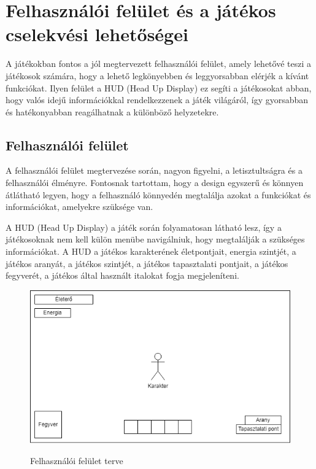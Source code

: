 \section{Felhasználói felület és a játékos cselekvési lehetőségei}

\indent \indent A játékokban fontos a jól megtervezett felhasználói felület, amely lehetővé teszi a játékosok számára, hogy a lehető legkönyebben és leggyorsabban elérjék a kívánt funkciókat. Ilyen felület a HUD (Head Up Display)  ez segíti a játékosokat abban, hogy valós idejű információkkal rendelkezzenek a játék világáról, így gyorsabban és hatékonyabban reagálhatnak a különböző helyzetekre.


\subsection{Felhasználói felület}

\indent \indent A felhasználói felület megtervezése során, nagyon figyelni, a letisztultságra és a felhasználói élményre. Fontosnak tartottam, hogy a design egyszerű és könnyen átlátható legyen, hogy a felhasználó könnyedén megtalálja azokat a funkciókat és információkat, amelyekre szüksége van.

A HUD (Head Up Display) a játék során folyamatosan látható lesz, így a játékosoknak nem kell külön menübe navigálniuk, hogy megtalálják a szükséges információkat. A HUD a játékos karakterének életpontjait, energia szintjét, a játékos aranyát, a játékos szintjét, a játékos tapasztalati pontjait, a játékos fegyverét, a játékos által használt italokat fogja megjeleníteni.

\begin{figure}[H]
    \centering
    \includegraphics[width=14.0truecm]{images/MS_UI.drawio.png}
    \caption{Felhasználói felület terve}
    \label{fig:Felhasználói felület}\cite{Felhasználói-felület-terve}
\end{figure}

